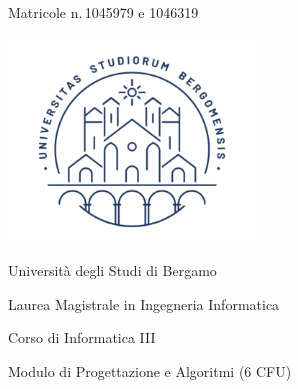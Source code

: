 \makeatletter
\begin{titlepage}
    \begin{center}
        \textbf{\Huge{\@title}}
        \vspace{1cm}
    
        \Huge{\@author}
        \vspace{0.2cm}
            
        \Large{Matricole n.\,1045979 e 1046319}
        \vspace{1cm}
                
        \includegraphics[width=0.5\textwidth]{images/logo.png}
        \vspace{1cm}
    
        \Huge{Università degli Studi di Bergamo}
        \vspace{0.2cm}
            
        \Large{Laurea Magistrale in Ingegneria Informatica}
        \vspace{0.2cm}
        
        \Large{Corso di Informatica III}
        \vspace{0.2cm}
        
        \Large{Modulo di Progettazione e Algoritmi (6 CFU)}
        \vspace{2cm}
            
        \Large{\@date}
    \end{center}
\end{titlepage}
\makeatother